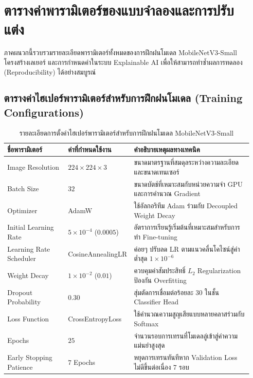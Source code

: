 \chapter{ตารางค่าพารามิเตอร์ของแบบจำลองและการปรับแต่ง}
\label{app:hyperparameters}

ภาคผนวกนี้รวบรวมรายละเอียดพารามิเตอร์ทั้งหมดของการฝึกฝนโมเดล MobileNetV3-Small โครงสร้างเลเยอร์ และการกำหนดค่าในระบบ Explainable AI เพื่อให้สามารถทำซ้ำผลการทดลอง (Reproducibility) ได้อย่างสมบูรณ์

\section{ตารางค่าไฮเปอร์พารามิเตอร์สำหรับการฝึกฝนโมเดล (Training Configurations)}

\begin{table}[H]
\caption{รายละเอียดการตั้งค่าไฮเปอร์พารามิเตอร์สำหรับการฝึกฝนโมเดล MobileNetV3-Small}
\label{tab:app_b_hyperparams}
\begin{tabularx}{\textwidth}{L{3.2cm}L{2.6cm}Y}
\toprule
\textbf{ชื่อพารามิเตอร์} & \textbf{ค่าที่กำหนดใช้งาน} & \textbf{คำอธิบายเหตุผลทางเทคนิค} \\
\midrule
Image Resolution & $224 \times 224 \times 3$ & ขนาดมาตรฐานที่สมดุลระหว่างความละเอียดและขนาดเทนเซอร์ \\
Batch Size & $32$ & ขนาดบัตช์ที่เหมาะสมกับหน่วยความจำ GPU และการคำนวณ Gradient \\
Optimizer & AdamW & ใช้อัลกอริทึม Adam ร่วมกับ Decoupled Weight Decay \\
Initial Learning Rate & $5 \times 10^{-4}$ ($0.0005$) & อัตราการเรียนรู้เริ่มต้นที่เหมาะสมสำหรับการทำ Fine-tuning \\
Learning Rate Scheduler & CosineAnnealingLR & ค่อยๆ ปรับลด LR ตามแนวคลื่นโคไซน์สู่ค่าต่ำสุด $1 \times 10^{-6}$ \\
Weight Decay & $1 \times 10^{-2}$ ($0.01$) & ควบคุมค่าสัมประสิทธิ์ $L_2$ Regularization ป้องกัน Overfitting \\
Dropout Probability & $0.30$ & สุ่มตัดการเชื่อมต่อร้อยละ 30 ในชั้น Classifier Head \\
Loss Function & CrossEntropyLoss & ใช้คำนวณความสูญเสียแบบหลายคลาสร่วมกับ Softmax \\
Epochs & $25$ & จำนวนรอบการเทรนที่โมเดลลู่เข้าสู่ค่าความแม่นยำสูงสุด \\
Early Stopping Patience & $7$ Epochs & หยุดการเทรนทันทีหาก Validation Loss ไม่ดีขึ้นต่อเนื่อง 7 รอบ \\
\bottomrule
\end{tabularx}
\end{table}

